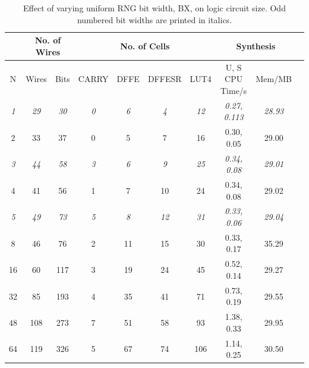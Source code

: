 \documentclass[12pt]{article}
\begin{document}
      \begin{table}[H]
        \centering
        \begin{tabular}{|c||c|c|c|c|c|c|c|c|c|}
          \hline
          &
          \multicolumn{2}{|c|}{No. of Wires}
          &
          \multicolumn{4}{|c|}{No. of Cells}
          &
          \multicolumn{2}{|c|}{Synthesis}\\
          \hline
          N & Wires & Bits & CARRY & DFFE & DFFESR & LUT4 & U, S CPU Time/s & Mem/MB\\
          \hline
          \hline
          \textit{1} & \textit{29} & \textit{30} & \textit{0} & \textit{6} & \textit{4} & \textit{12} & \textit{0.27, 0.113} & \textit{28.93}\\
          \hline
          2 & 33 & 37 & 0 & 5 & 7 & 16 & 0.30, 0.05 & 29.00\\
          \hline
          \textit{3} & \textit{44} & \textit{58} & \textit{3} & \textit{6} & \textit{9} & \textit{25} & \textit{0.34, 0.08} & \textit{29.01}\\
          \hline
          4 & 41 & 56 & 1 & 7 & 10 & 24 & 0.34, 0.08 & 29.02\\
          \hline
          \textit{5} & \textit{49} & \textit{73} & \textit{5} & \textit{8} & \textit{12} & \textit{31} & \textit{0.33, 0.06} & \textit{29.04}\\
          \hline
          8 & 46 & 76 & 2 & 11 & 15 & 30 & 0.33, 0.17 & 35.29\\
          \hline
          16 & 60 & 117 & 3 & 19 & 24 & 45 & 0.52, 0.14 & 29.27\\
          \hline
          32 & 85 & 193 & 4 & 35 & 41 & 71 & 0.73, 0.19 & 29.55\\
          \hline
          48 & 108 & 273 & 7 & 51 & 58 & 93 & 1.38, 0.33 & 29.95\\
          \hline
          64 & 119 & 326 & 5 & 67 & 74 & 106 & 1.14, 0.25 & 30.50\\
          \hline
        \end{tabular}
        \caption{Effect of varying uniform RNG bit width, BX, on logic circuit size. Odd numbered bit widths are printed in italics.}
        \label{table:urng_bx}
      \end{table}
\end{document}
